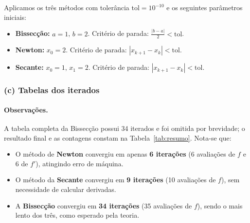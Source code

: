 \documentclass[12pt, a4paper]{article}
\begin{document}
Aplicamos os três métodos com tolerância $\text{tol} = 10^{-10}$ e os seguintes parâmetros iniciais:
\begin{itemize}
    \item \textbf{Bissecção:} $a = 1$, $b = 2$. Critério de parada: $\frac{|b - a|}{2} < \text{tol}$.
    \item \textbf{Newton:} $x_0 = 2$. Critério de parada: $|x_{k+1} - x_k| < \text{tol}$.
    \item \textbf{Secante:} $x_0 = 1$, $x_1 = 2$. Critério de parada: $|x_{k+1} - x_k| < \text{tol}$.
\end{itemize}


\subsubsection*{(c) Tabelas dos iterados}

\begin{table}[H]
    \centering
    \caption{Iterados do Método de Newton ($x_0 = 2$).}
    \label{tab:newton}
    
\end{table}

\begin{table}[H]
    \centering
    \caption{Iterados do Método da Secante ($x_0 = 1$, $x_1 = 2$).}
    \label{tab:secante}
    
\end{table}

\begin{table}[H]
    \centering
    \caption{Resumo comparativo dos três métodos.}
    \label{tab:resumo}
    
\end{table}

\paragraph{Observações.}
A tabela completa da Bissecção possui 34 iterados e foi omitida por brevidade; o resultado final e as contagens constam na Tabela~\ref{tab:resumo}. Nota-se que:
\begin{itemize}
    \item O método de \textbf{Newton} convergiu em apenas \textbf{6 iterações} (6 avaliações de $f$ e 6 de $f'$), atingindo erro de máquina.
    \item O método da \textbf{Secante} convergiu em \textbf{9 iterações} (10 avaliações de $f$), sem necessidade de calcular derivadas.
    \item A \textbf{Bissecção} convergiu em \textbf{34 iterações} (35 avaliações de $f$), sendo o mais lento dos três, como esperado pela teoria.
\end{itemize}
\end{document}
